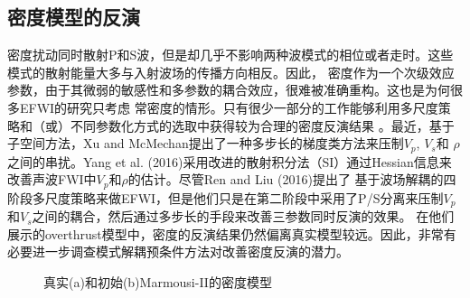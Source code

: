 \subsection{密度模型的反演}
密度扰动同时散射P和S波，但是却几乎不影响两种波模式的相位或者走时。这些模式的散射能量大多与入射波场的传播方向相反\cite[]{wu.aki:1985,tarantola:1986}。因此，
密度作为一个次级效应参数，由于其微弱的敏感性和多参数的耦合效应\cite[]{tarantola:1986,forgues.lambare:1997}，很难被准确重构。这也是为何很多EFWI的研究只考虑
常密度的情形\cite[]{shipp:2002,sears2008,brossier2009}。只有很少一部分的工作能够利用多尺度策略和（或）不同参数化方式的选取中获得较为合理的密度反演结果
\cite{jeong2012full}。最近，基于子空间方法\cite[]{kennett:1988}，Xu and McMechan\cite{xu.mcmechan:2014}提出了一种多步长的梯度类方法来压制$V_p$, $V_s$和
$\rho$之间的串扰。Yang et al.
(2016)\cite{Yang2016}采用改进的散射积分法（SI）通过Hessian信息来改善声波FWI中$V_p$和$\rho$的估计。尽管Ren
and Liu (2016)\cite{ren.liu:2016}提出了
基于波场解耦的四阶段多尺度策略来做EFWI，但是他们只是在第二阶段中采用了P/S分离来压制$V_p$和$V_s$之间的耦合，然后通过多步长的手段来改善三参数同时反演的效果。
在他们展示的overthrust模型中，密度的反演结果仍然偏离真实模型较远。因此，非常有必要进一步调查模式解耦预条件方法对改善密度反演的潜力。
\begin{figure}
    \begin{center}
    \caption{
		真实(a)和初始(b)Marmousi-II的密度模型
    }
    \label{fig:Marrho}
    \end{center}
\end{figure}


